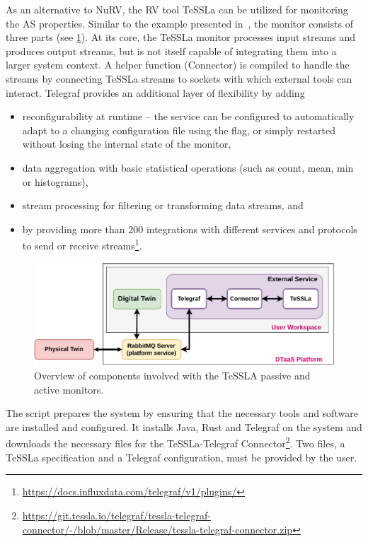 As an alternative to NuRV, the RV tool TeSSLa can be utilized for monitoring the AS properties.
Similar to the example presented in~\cite{TT-Connector}, the monitor consists of three parts (see \cref{fig:architecture-diagram}).
At its core, the TeSSLa monitor processes input streams and produces output streams, but is not itself capable of integrating them into a larger system context.
A helper function (Connector) is compiled to handle the streams by connecting TeSSLa streams to sockets with which external tools can interact.
Telegraf provides an additional layer of flexibility by adding
\begin{itemize}
	\item reconfigurability at runtime -- the service can be configured to automatically adapt to a changing configuration file using the  flag, or simply restarted without losing the internal state of the monitor,
	\item data aggregation with basic statistical operations (such as count, mean, min or histograms),
	\item stream processing for filtering or transforming data streams, and
	\item by providing more than 200 integrations with different services and protocols to send or receive streams\footnote{\url{https://docs.influxdata.com/telegraf/v1/plugins/}}.
\end{itemize}%
%
\begin{figure}[tbp]
	\centering
	\includegraphics[width=\columnwidth]{images/TeSSLa-integration.pdf}
	\caption{Overview of components involved with the TeSSLA passive and active monitors.}
	\label{fig:architecture-diagram}
\end{figure}%
%
The  script prepares the system by ensuring that the necessary tools and software are installed and configured.
It installs Java, Rust and Telegraf on the system and downloads the necessary files for the TeSSLa-Telegraf Connector\footnote{\url{https://git.tessla.io/telegraf/tessla-telegraf-connector/-/blob/master/Release/tessla-telegraf-connector.zip}}. Two files, a TeSSLa specification and a Telegraf configuration, must be provided by the user.

